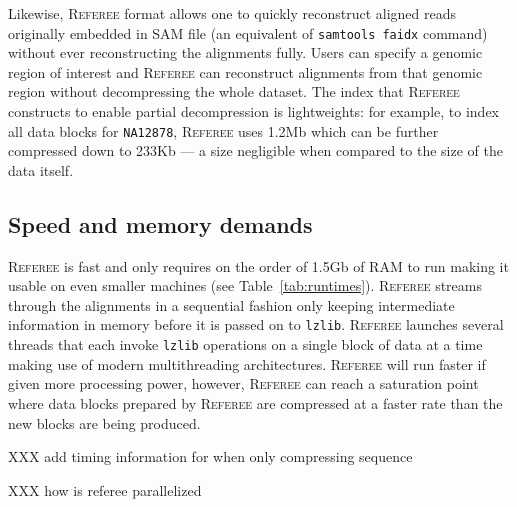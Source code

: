 \documentclass[12pt]{cmuthesis}
\newcommand{\refer}{\textsc{Referee}\xspace}
\begin{document}
  Likewise, \refer format allows one to quickly reconstruct aligned reads originally embedded in SAM file (an equivalent of \texttt{samtools faidx} command) without ever reconstructing the alignments fully. Users can specify a genomic region of interest and \refer can reconstruct alignments from that genomic region without decompressing the whole dataset. The index that \refer constructs to enable partial decompression is lightweights: for example, to index all data blocks for \texttt{NA12878}, \refer uses 1.2Mb which can be further compressed down to 233Kb --- a size negligible when compared to the size of the data itself.




  \subsection{Speed and memory demands}

  \refer is fast and only requires on the order of 1.5Gb of RAM to run making it usable on even smaller machines (see Table~\ref{tab:runtimes}). \refer streams through the alignments in a sequential fashion only keeping intermediate information in memory before it is passed on to \texttt{lzlib}. \refer launches several threads that each invoke \texttt{lzlib} operations on a single block of data at a time making use of modern multithreading architectures. \refer will run faster if given more processing power, however, \refer can reach a saturation point where data blocks prepared by \refer are compressed at a faster rate than the new blocks are being produced.

  XXX add timing information for when only compressing sequence

  XXX how is referee parallelized


\end{document}
